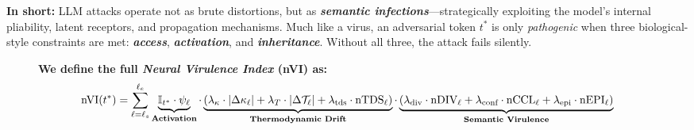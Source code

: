 \vspace{0.5em}
\noindent
\textbf{In short:} LLM attacks operate not as brute distortions, but as \textbf{\emph{semantic infections}}—strategically exploiting the model’s internal pliability, latent receptors, and propagation mechanisms. Much like a virus, an adversarial token $t^*$ is only \emph{pathogenic} when three biological-style constraints are met: \textbf{\emph{access}}, \textbf{\emph{activation}}, and \textbf{\emph{inheritance}}. Without all three, the attack fails silently.


\begin{figure}[ht!]
\vspace{-4mm}
\centering
\begin{tcolorbox}[
  enhanced,
  colback=white,
  colframe=black,
  boxrule=1pt,
  borderline={0.6pt}{2pt}{black},
  sharp corners,
  width=\textwidth,
]
\vspace{-1mm}
\textbf{We define the full \textit{Neural Virulence Index} (\textbf{nVI}) as:}
\[
\text{nVI}(t^*) = \sum_{\ell = \ell_s}^{\ell_e}
\underbrace{
  \mathbb{I}_{t^*} \cdot \psi_\ell
}_{\text{\textbf{Activation}}}
\cdot
\underbrace{
  \left(
    \lambda_\kappa \cdot |\Delta \kappa_\ell| +
    \lambda_T \cdot |\Delta \mathcal{T}_\ell| +
    \lambda_{\text{tds}} \cdot \text{nTDS}_\ell
  \right)
}_{\text{\textbf{Thermodynamic Drift}}}
\cdot
\underbrace{
  \left(
    \lambda_{\text{div}} \cdot \text{nDIV}_\ell +
    \lambda_{\text{conf}} \cdot \text{nCCL}_\ell +
    \lambda_{\text{epi}} \cdot \text{nEPI}_\ell
  \right)
}_{\text{\textbf{Semantic Virulence}}}
\]
\vspace{-4mm}
\end{tcolorbox}


\end{figure}

